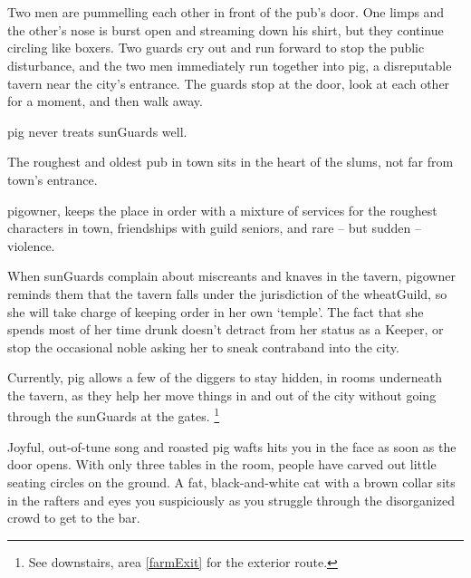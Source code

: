 \section{}

\begin{multicols}{2}

\begin{boxtext}
  Two men are pummelling each other in front of the pub's door.
   One limps and the other's nose is burst open and streaming down his shirt, but they continue circling like boxers.
   Two guards cry out and run forward to stop the public disturbance, and the two men immediately run together into \gls{pig}, a disreputable tavern near the city's entrance.
   The guards stop at the door, look at each other for a moment, and then walk away.

\Gls{pig} never treats \glspl{sunGuard} well.
\end{boxtext}
 
The roughest and oldest pub in \gls{town} sits in the heart of the slums, not far from \gls{town}'s entrance.

\Gls{pigowner}, keeps the place in order with a mixture of services for the roughest characters in \gls{town}, friendships with guild seniors, and rare -- but sudden -- violence.

When \glspl{sunGuard} complain about miscreants and knaves in the tavern, \gls{pigowner} reminds them that the tavern falls under the jurisdiction of the \gls{wheatGuild}, so she will take charge of keeping order in her own `temple'.
The fact that she spends most of her time drunk doesn't detract from her status as a Keeper, or stop the occasional noble asking her to sneak contraband into the city.

Currently, \gls{pig} allows a few of the \glspl{digger} to stay hidden, in rooms underneath the tavern, as they help her move things in and out of the city without going through the \glspl{sunGuard} at the gates.%
\footnote{See downstairs, area \vref{farmExit} for the exterior route.}

\begin{boxtext}
  Joyful, out-of-tune song and roasted pig wafts hits you in the face as soon as the door opens.
  With only three tables in the room, people have carved out little seating circles on the ground.
  A fat, black-and-white cat with a brown collar sits in the rafters and eyes you suspiciously as you struggle through the disorganized crowd to get to the bar.
\end{boxtext}
\label{pigCat}


\end{multicols}
